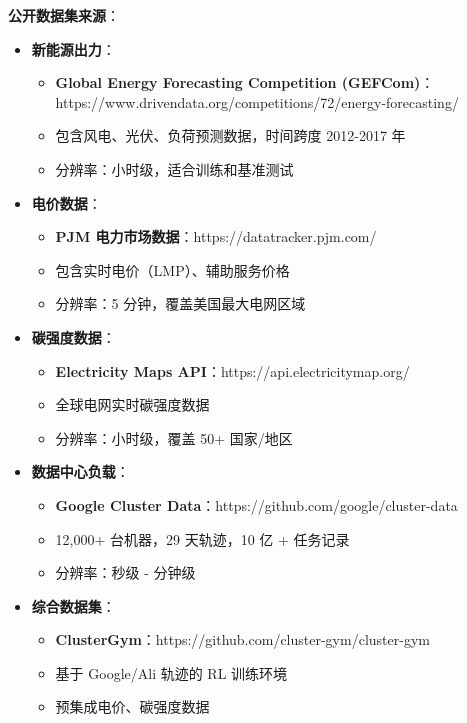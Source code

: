 \documentclass[12pt,a4paper]{article}
\begin{document}
\textbf{公开数据集来源}：

\begin{itemize}
    \item \textbf{新能源出力}：
    \begin{itemize}
        \item \textbf{Global Energy Forecasting Competition (GEFCom)}：https://www.drivendata.org/competitions/72/energy-forecasting/
        \item 包含风电、光伏、负荷预测数据，时间跨度 2012-2017 年
        \item 分辨率：小时级，适合训练和基准测试
    \end{itemize}
    
    \item \textbf{电价数据}：
    \begin{itemize}
        \item \textbf{PJM 电力市场数据}：https://datatracker.pjm.com/
        \item 包含实时电价（LMP）、辅助服务价格
        \item 分辨率：5 分钟，覆盖美国最大电网区域
    \end{itemize}
    
    \item \textbf{碳强度数据}：
    \begin{itemize}
        \item \textbf{Electricity Maps API}：https://api.electricitymap.org/
        \item 全球电网实时碳强度数据
        \item 分辨率：小时级，覆盖 50+ 国家/地区
    \end{itemize}
    
    \item \textbf{数据中心负载}：
    \begin{itemize}
        \item \textbf{Google Cluster Data}：https://github.com/google/cluster-data
        \item 12,000+ 台机器，29 天轨迹，10 亿 + 任务记录
        \item 分辨率：秒级 - 分钟级
    \end{itemize}
    
    \item \textbf{综合数据集}：
    \begin{itemize}
        \item \textbf{ClusterGym}：https://github.com/cluster-gym/cluster-gym
        \item 基于 Google/Ali 轨迹的 RL 训练环境
        \item 预集成电价、碳强度数据
    \end{itemize}
\end{itemize}
\end{document}
